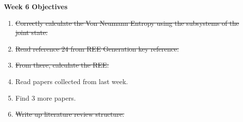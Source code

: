 \documentclass{article}
\begin{document}
\Large{\textbf{Week 6 Objectives}}
\\
\begin{enumerate}
    \item \sout{Correctly calculate the Von Neumann Entropy using the subsystems of the joint state.} 
    \item \sout{Read reference 24 from REE Generation key reference.}
    \item \sout{From there, calculate the REE.}
    \item Read papers collected from last week.
    \item Find 3 more papers.
    \item \sout{Write up literature review structure.}
    


\end{enumerate}
\end{document}
